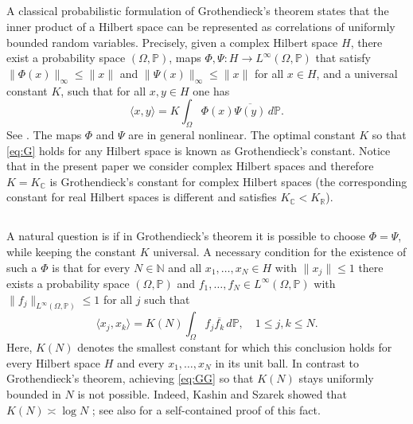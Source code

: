 \documentclass[reqno,a4paper,12pt]{amsart}
\numberwithin{equation}{section}
\def\N{{\mathbb N}}
\def\R{{\mathbb R}}
\def\C{{\mathbb C}}
\newcommand\1{\mathds{1}}
\begin{document}
\subsection{}
A classical probabilistic formulation of Grothendieck's theorem \cite{grothendieck1953resume} states that the inner product of a Hilbert space can be represented as correlations of uniformly bounded random variables. Precisely, given a complex Hilbert space $H$, there exist a probability space $(\Omega,\mathbb P)$, maps $\Phi,\Psi :H \to L^\infty(\Omega,\mathbb P)$ that satisfy $\| \Phi(x) \|_\infty \leq \| x \|$ and $\| \Psi(x) \|_\infty \leq \| x \|$ for all $x \in H$, and a universal constant $K$, such that for all $x,y \in H$ one has
\begin{equation}\label{eq:G}
    \langle x,y \rangle = K \int_\Omega \Phi(x) \overline{\Psi(y)} \, d \mathbb P.
\end{equation}
See \cite[Theorem 3.4]{pisier2012grothendieck}. The maps $\Phi$ and $\Psi$ are in general nonlinear. The optimal constant $K$ so that \eqref{eq:G} holds for any Hilbert space is known as Grothendieck's constant. Notice that in the present paper we consider complex Hilbert spaces and therefore $K=K_\C$ is Grothendieck's constant for complex Hilbert spaces (the corresponding constant for real Hilbert spaces is different and satisfies $K_\C < K_\R$).

\subsection{}
A natural question is if in Grothendieck's theorem it is possible to choose $\Phi = \Psi$, while keeping the constant $K$ universal. A necessary condition for the existence of such a $\Phi$ is that for every $N \in \N$ and all $x_1, \dots, x_N \in H$ with $\|x_j\| \leq 1$ there exists a probability space $(\Omega,\mathbb P)$ and $f_1, \dots, f_N \in L^\infty(\Omega,\mathbb P)$ with $\|f_j\|_{L^\infty(\Omega,\mathbb P)}\leq 1$ for all $j$ such that
\begin{equation}\label{eq:GG}
    \langle x_j,x_k\rangle = K(N) \int_\Omega f_j \overline{f_k} \, d\mathbb P, \quad 1\le j,k\le N.
\end{equation}
Here, $K(N)$ denotes the smallest constant for which this conclusion holds for every Hilbert space $H$ and every $x_1,\dots,x_N$ in its unit ball. In contrast to Grothendieck's theorem, achieving \eqref{eq:GG} so that $K(N)$ stays uniformly bounded in $N$ is not possible. Indeed, Kashin and Szarek showed that $K(N)\asymp \log N$ \cite{kashinSzarek2003knaster,kashinSzarek2003gram}; see also \cite[Remark~3.6]{pisier2012grothendieck} for a self-contained proof of this fact.
\end{document}
